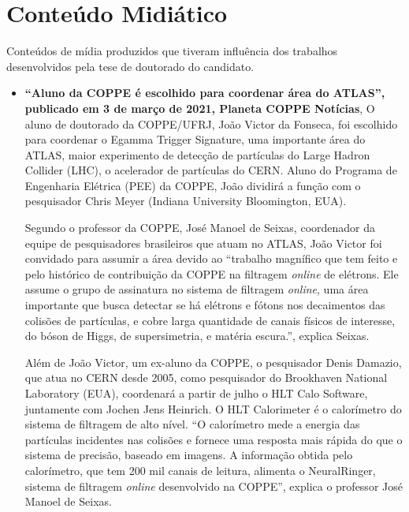 

\section{Conteúdo Midiático}

Conteúdos de mídia produzidos que tiveram influência dos trabalhos desenvolvidos pela tese de doutorado do candidato.

\begin{itemize}


\item \textbf{``Aluno da COPPE é escolhido para coordenar área do ATLAS'', publicado em 3 de março de 2021, 
    Planeta COPPE Notícias},
    O aluno de doutorado da COPPE/UFRJ, João Victor da Fonseca, foi escolhido para 
    coordenar o Egamma Trigger Signature, uma importante área do ATLAS, maior experimento 
    de detecção de partículas do Large Hadron Collider (LHC), o acelerador de partículas 
    do CERN.  Aluno do Programa de Engenharia Elétrica (PEE) da COPPE, João dividirá a 
    função com o pesquisador Chris Meyer (Indiana University Bloomington, EUA). 

    Segundo o professor da COPPE, José Manoel de Seixas, coordenador da equipe de 
    pesquisadores brasileiros que atuam no ATLAS, João Victor foi convidado para 
    assumir a área devido ao ``trabalho magnífico que tem feito e pelo histórico 
    de contribuição da COPPE na filtragem \emph{online} de elétrons. Ele assume o grupo 
    de assinatura no sistema de filtragem \emph{online}, uma área importante que busca 
    detectar se há elétrons e fótons nos decaimentos das colisões de partículas, e 
    cobre larga quantidade de canais físicos de interesse, do bóson de Higgs, de 
    supersimetria, e matéria escura.'', explica Seixas.

    Além de João Victor, um ex-aluno da COPPE, o pesquisador Denis Damazio, que atua no 
    CERN desde 2005, como pesquisador do Brookhaven National Laboratory (EUA), coordenará 
    a partir de julho o HLT Calo Software, juntamente com Jochen Jens Heinrich. O HLT 
    Calorimeter é o calorímetro do sistema de filtragem de alto nível.
    ``O calorímetro mede a energia das partículas incidentes nas colisões e fornece 
    uma resposta mais rápida do que o sistema de precisão, baseado em imagens. 
    A informação obtida pelo calorímetro, que tem 200 mil canais de leitura, alimenta o 
    NeuralRinger, sistema de filtragem \emph{online} desenvolvido na COPPE'', explica o 
    professor José Manoel de Seixas.


\end{itemize}
